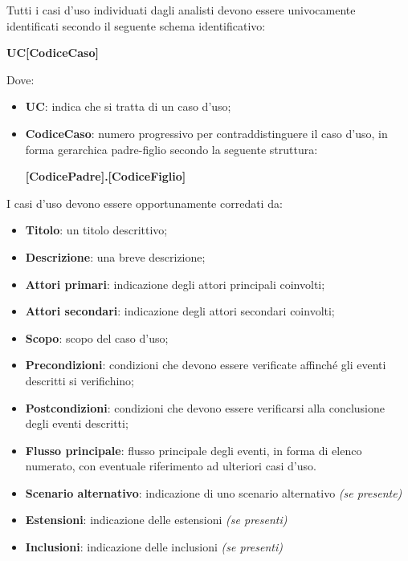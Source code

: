 Tutti i casi d'uso individuati dagli analisti devono essere univocamente identificati secondo il seguente schema identificativo:

\begin{center}
    \textbf{UC[CodiceCaso]}
\end{center}

Dove:

\begin{itemize}
    \item \textbf{UC}: indica che si tratta di un caso d'uso;
    \item \textbf{CodiceCaso}: numero progressivo per contraddistinguere il caso d'uso, in forma gerarchica padre-figlio secondo la seguente struttura:
    \begin{center}
        \textbf{[CodicePadre].[CodiceFiglio]}
    \end{center}
\end{itemize}

I casi d'uso devono essere opportunamente corredati da:

\begin{itemize}
    \item \textbf{Titolo}: un titolo descrittivo;
    \item \textbf{Descrizione}: una breve descrizione;
    \item \textbf{Attori primari}: indicazione degli attori principali coinvolti;
    \item \textbf{Attori secondari}: indicazione degli attori secondari coinvolti;
    \item \textbf{Scopo}: scopo del caso d'uso;
    \item \textbf{Precondizioni}: condizioni che devono essere verificate affinch\'{e} gli eventi descritti si verifichino;
    \item \textbf{Postcondizioni}: condizioni che devono essere verificarsi alla conclusione degli eventi descritti; 
    \item \textbf{Flusso principale}: flusso principale degli eventi, in forma di elenco numerato, con eventuale riferimento ad ulteriori casi d'uso.
    \item \textbf{Scenario alternativo}: indicazione di uno scenario alternativo \emph{(se presente)}
    \item \textbf{Estensioni}: indicazione delle estensioni \emph{(se presenti)}
    \item \textbf{Inclusioni}: indicazione delle inclusioni \emph{(se presenti)} 
\end{itemize}